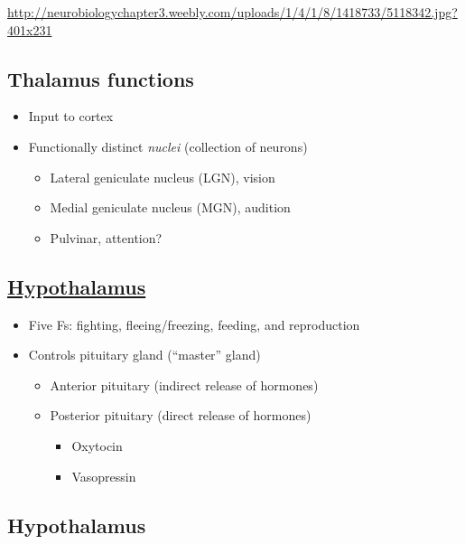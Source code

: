 \documentclass[]{article}
\providecommand{\tightlist}{%
  \setlength{\itemsep}{0pt}\setlength{\parskip}{0pt}}
\begin{document}
\url{http://neurobiologychapter3.weebly.com/uploads/1/4/1/8/1418733/5118342.jpg?401x231}

\subsection{Thalamus functions}\label{thalamus-functions}

\begin{itemize}
\tightlist
\item
  Input to cortex
\item
  Functionally distinct \emph{nuclei} (collection of neurons)

  \begin{itemize}
  \tightlist
  \item
    Lateral geniculate nucleus (LGN), vision
  \item
    Medial geniculate nucleus (MGN), audition
  \item
    Pulvinar, attention?
  \end{itemize}
\end{itemize}

\subsection{\texorpdfstring{\href{https://en.wikipedia.org/wiki/Hypothalamus}{Hypothalamus}}{Hypothalamus}}\label{hypothalamus}

\begin{itemize}
\tightlist
\item
  Five Fs: fighting, fleeing/freezing, feeding, and reproduction
\item
  Controls pituitary gland (``master'' gland)

  \begin{itemize}
  \tightlist
  \item
    Anterior pituitary (indirect release of hormones)
  \item
    Posterior pituitary (direct release of hormones)

    \begin{itemize}
    \tightlist
    \item
      Oxytocin
    \item
      Vasopressin
    \end{itemize}
  \end{itemize}
\end{itemize}

\subsection{Hypothalamus}\label{hypothalamus-1}
\end{document}
